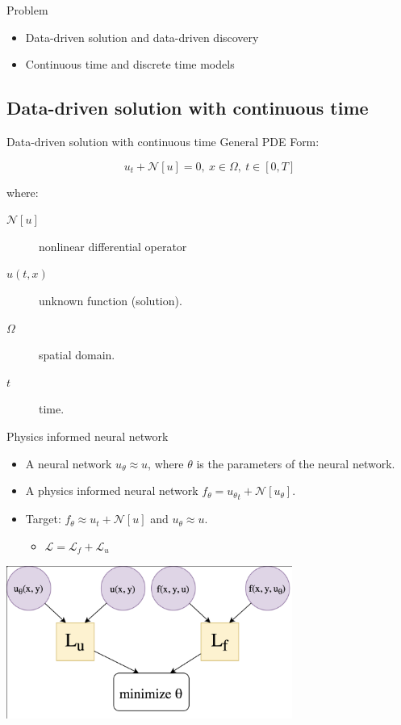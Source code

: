 \documentclass[aspectratio=1610,xcolor={dvipsnames},hyperref={colorlinks,unicode,linkcolor=violet,anchorcolor=BlueViolet,citecolor=YellowOrange,filecolor=black,urlcolor=Aquamarine}]{beamer}
\begin{document}
\begin{frame}[label={sec:org86c56b7}]{Problem}
\begin{itemize}
\item Data-driven solution and data-driven discovery
\item Continuous time and discrete time models
\end{itemize}
\end{frame}

\subsection{Data-driven solution with continuous time}
\label{sec:orgdbaaf29}

\begin{frame}[label={sec:orgd383ca6}]{Data-driven solution with continuous time}
General PDE Form:

\[u_t + \mathcal{N}[u] = 0,\ x \in \Omega, \ t\in[0,T]\]

where:
\begin{description}
\item[{\(\mathcal{N}[u]\)}] nonlinear differential operator
\item[{\(u(t, x)\)}] unknown function (solution).
\item[{\(\Omega\)}] spatial domain.
\item[{\(t\)}] time.
\end{description}
\end{frame}

\begin{frame}[label={sec:orgcbc9f8f}]{Physics informed neural network}
\begin{itemize}
\item A neural network \(u_{\theta} \approx u\), where \(\theta\) is the parameters of the neural network.
\item A \alert{physics informed neural network} \(f_{\theta} = {u_{\theta}}_{t} + \mathcal{N}[u_{\theta}]\).
\item Target: \(f_{\theta} \approx u_{t} + \mathcal{N}[u]\) and \(u_{\theta} \approx u\).
\begin{itemize}
\item \(\mathcal{L} = \mathcal{L}_{f} + \mathcal{L}_{u}\)
\end{itemize}
\end{itemize}

\begin{center}
\includegraphics[height=5cm]{./p6.png}
\end{center}
\end{frame}
\end{document}
